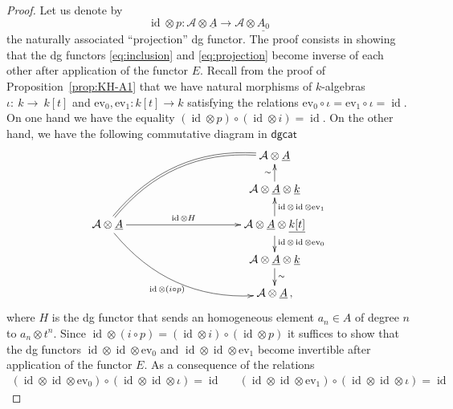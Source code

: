 \documentclass{amsart}
\numberwithin{equation}{subsection}
\theoremstyle{remark}
\theoremstyle{remark}
\theoremstyle{remark}
\theoremstyle{remark}
\begin{document}
\begin{proof}
Let us denote by 
\begin{equation}\label{eq:projection}
\operatorname{id} \otimes p: {{\mathcal A}} \otimes \underline{A} \to {{\mathcal A}} \otimes \underline{A_0}
\end{equation}
the naturally associated ``projection'' dg functor. The proof consists in showing that the dg functors \eqref{eq:inclusion} and \eqref{eq:projection} become inverse of each other after application of the functor $E$.
Recall from the proof of Proposition~\ref{prop:KH-A1} that we have natural morphisms of $k$-algebras $\iota:~k \to~k[t]$ and $\mathrm{ev}_0, \mathrm{ev}_1: k[t] \to k$ satisfying the relations $\mathrm{ev}_0 \circ \iota =\mathrm{ev}_1 \circ \iota=\operatorname{id}$.  On one hand we have the equality $(\operatorname{id} \otimes p) \circ (\operatorname{id} \otimes i) = \operatorname{id}$. On the other hand, we have the following commutative diagram in ${\mathsf{dgcat}}$
\begin{equation*}
\xymatrix@C=3em@R=1.5em{
&&& {{\mathcal A}} \otimes \underline{A} \\
&&& {{\mathcal A}} \otimes \underline{A} \otimes \underline{k} \ar[u]^{\sim}\\
{{\mathcal A}} \otimes \underline{A} \ar@/^2.0pc/@{=}[uurrr] \ar@/_2.0pc/[ddrrr]_-{\operatorname{id} \otimes (i\circ p)} \ar[rrr]^-{\operatorname{id} \otimes H} &&& {{\mathcal A}} \otimes \underline{A}\otimes \underline{k[t]} \ar[u]_{\operatorname{id} \otimes \operatorname{id} \otimes \mathrm{ev}_1} \ar[d]^{\operatorname{id} \otimes \operatorname{id} \otimes \mathrm{ev}_0}\\
&&& {{\mathcal A}} \otimes \underline{A} \otimes \underline{k} \ar[d]^{\sim} \\
&&& {{\mathcal A}} \otimes \underline{A}\,,
}
\end{equation*}
where $H$ is the dg functor that sends an homogeneous element $a_n \in A$ of degree $n$ to $a_n\otimes t^n$. Since $\operatorname{id} \otimes (i \circ p) = (\operatorname{id} \otimes i) \circ (\operatorname{id} \otimes p)$ it suffices to show that the dg functors $\operatorname{id}\otimes \operatorname{id} \otimes \mathrm{ev}_0$ and $\operatorname{id}\otimes \operatorname{id} \otimes \mathrm{ev}_1$ become invertible after application of the functor $E$. As a consequence of the relations
\begin{eqnarray*}
(\operatorname{id} \otimes \operatorname{id} \otimes \mathrm{ev}_0) \circ (\operatorname{id} \otimes \operatorname{id} \otimes \iota) = \operatorname{id} && (\operatorname{id} \otimes \operatorname{id} \otimes \mathrm{ev}_1) \circ (\operatorname{id} \otimes \operatorname{id} \otimes \iota) = \operatorname{id}

\end{eqnarray*}
\end{proof}
\end{document}
